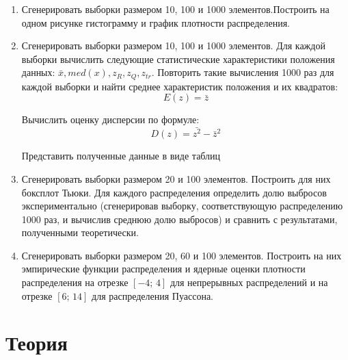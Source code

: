 \documentclass[a4paper]{article}
\begin{document}
\begin{enumerate}
\item Сгенерировать выборки размером 10, 100 и 1000 элементов.\newline Построить на одном рисунке гистограмму и график плотности распределения.


\item Сгенерировать выборки размером 10, 100 и 1000 элементов. Для каждой выборки вычислить следующие статистические характеристики положения данных: $\bar{x}, med(x), z_R, z_Q, z_{tr}$. Повторить такие вычисления 1000 раз для каждой выборки и найти среднее характеристик положения и их квадратов:
\begin{equation} \label{eq:median}
	E(z) = \bar{z}
\end{equation}

\noindent Вычислить оценку дисперсии по формуле:
\begin{equation} \label{eq:dispersion}
	D(z) = \bar{z^2} - \bar{z}^2
\end{equation}

\noindent Представить полученные данные в виде таблиц


\item Сгенерировать выборки размером 20 и 100 элементов. Построить для них боксплот Тьюки.
Для каждого распределения определить долю выбросов экспериментально (сгенерировав выборку, соответствующую распределению 1000 раз, и вычислив среднюю долю выбросов) и сравнить с результатами, полученными теоретически.


\item Сгенерировать выборки размером 20, 60 и 100 элементов. Построить на них эмпирические функции распределения и ядерные оценки плотности распределения на отрезке $[-4;\,4]$ для непрерывных распределений и на отрезке $[6;\,14]$ для распределения Пуассона.


\end{enumerate}

\section {Теория}
\end{document}
